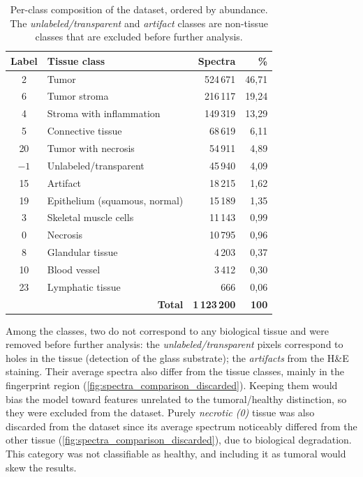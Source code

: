\begin{table}[ht]
    \centering
    \begin{tabular}{|c|l|r|r|}
        \hline
        \textbf{Label} & \textbf{Tissue class} & \textbf{Spectra} & \textbf{\%} \\
        \hline
        2  & Tumor                         & 524\,671 & 46,71 \\
        6  & Tumor stroma                  & 216\,117 & 19,24 \\
        4  & Stroma with inflammation      & 149\,319 & 13,29 \\
        5  & Connective tissue             & 68\,619  & 6,11  \\
        20 & Tumor with necrosis           & 54\,911  & 4,89  \\
        $-1$ & Unlabeled/transparent       & 45\,940  & 4,09  \\
        15 & Artifact                      & 18\,215  & 1,62  \\
        19 & Epithelium (squamous, normal) & 15\,189  & 1,35  \\
        3  & Skeletal muscle cells         & 11\,143  & 0,99  \\
        0  & Necrosis                      & 10\,795  & 0,96  \\
        8  & Glandular tissue              & 4\,203   & 0,37  \\
        10 & Blood vessel                  & 3\,412   & 0,30  \\
        23 & Lymphatic tissue              & 666      & 0,06  \\
        \hline
        \multicolumn{2}{|r|}{\textbf{Total}} & \textbf{1\,123\,200} & \textbf{100} \\
        \hline
    \end{tabular}
    \caption{Per-class composition of the dataset, ordered by abundance. The \textit{unlabeled/transparent} and \textit{artifact} classes are non-tissue classes that are excluded before further analysis.}
    \label{tab:label-distribution}
\end{table}

Among the classes, two do not correspond to any biological tissue and were removed before further analysis: the \textit{unlabeled/transparent} pixels correspond to holes in the tissue (detection of the glass substrate); the \textit{artifacts} from the H\&E staining. Their average spectra also differ from the tissue classes, mainly in the fingerprint region (\cref{fig:spectra_comparison_discarded}). Keeping them would bias the model toward features unrelated to the tumoral/healthy distinction, so they were excluded from the dataset. Purely \textit{necrotic (0)} tissue was also discarded from the dataset since its average spectrum noticeably differed from the other tissue (\cref{fig:spectra_comparison_discarded}), due to biological degradation. This category was not classifiable as healthy, and including it as tumoral would skew the results.

